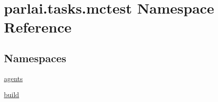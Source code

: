 \hypertarget{namespaceparlai_1_1tasks_1_1mctest}{}\section{parlai.\+tasks.\+mctest Namespace Reference}
\label{namespaceparlai_1_1tasks_1_1mctest}
\subsection*{Namespaces}
\begin{DoxyCompactItemize}
\item 
 \hyperlink{namespaceparlai_1_1tasks_1_1mctest_1_1agents}{agents}
\item 
 \hyperlink{namespaceparlai_1_1tasks_1_1mctest_1_1build}{build}
\end{DoxyCompactItemize}
